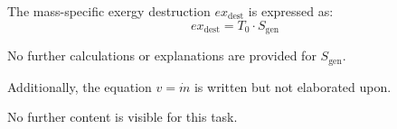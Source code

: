 The mass-specific exergy destruction \( ex_{\text{dest}} \) is expressed as:  
\[
ex_{\text{dest}} = T_0 \cdot S_{\text{gen}}
\]  

No further calculations or explanations are provided for \( S_{\text{gen}} \).  

Additionally, the equation \( v = \dot{m} \) is written but not elaborated upon.  

No further content is visible for this task.